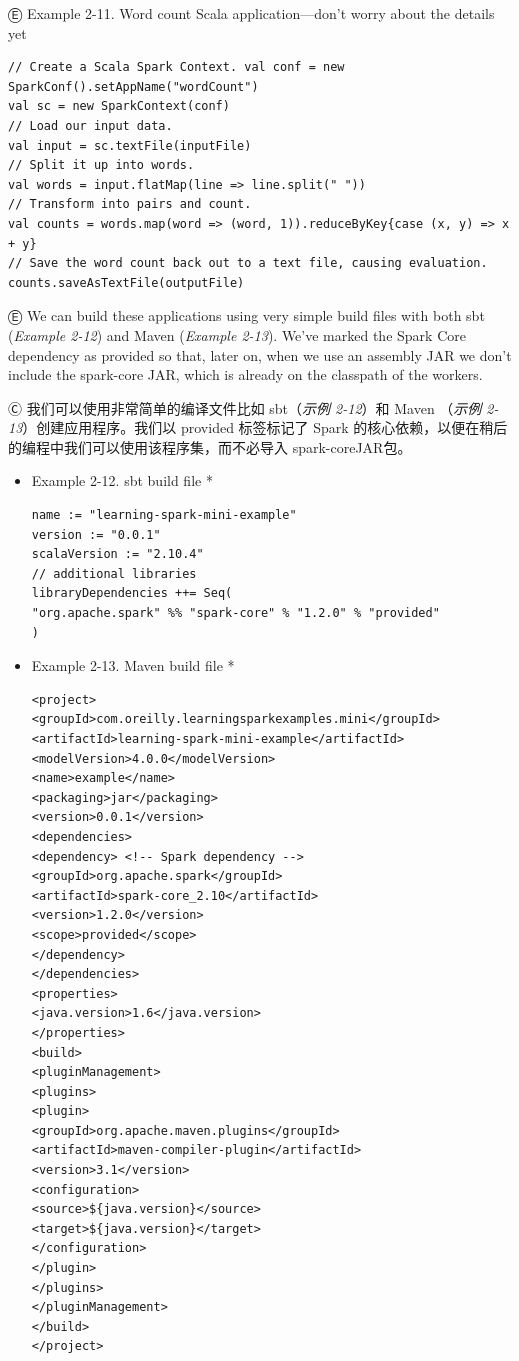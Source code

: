 {{Ⓔ Example 2-11. Word count Scala application---don't worry about the
details yet

\begin{lstlisting}
// Create a Scala Spark Context. val conf = new
SparkConf().setAppName("wordCount")
val sc = new SparkContext(conf)
// Load our input data.
val input = sc.textFile(inputFile)
// Split it up into words.
val words = input.flatMap(line => line.split(" "))
// Transform into pairs and count.
val counts = words.map(word => (word, 1)).reduceByKey{case (x, y) => x + y}
// Save the word count back out to a text file, causing evaluation.
counts.saveAsTextFile(outputFile)
\end{lstlisting}

Ⓔ \textcolor{etc}{We can build these applications using very simple build files with both sbt (\emph{Example 2-12}) and Maven (\emph{Example 2-13}). We've marked the Spark Core dependency as provided so that, later on, when we use an assembly JAR we don't include the spark-core JAR, which is already on the classpath of the workers.}

Ⓒ 我们可以使用非常简单的编译文件比如 sbt（\emph{示例 2-12}）和 Maven
（\emph{示例 2-13}）创建应用程序。我们以 provided 标签标记了 Spark
的核心依赖，以便在稍后的编程中我们可以使用该程序集，而不必导入
spark-coreJAR包。

\begin{itemize}
\item
  Example 2-12. sbt build file *

\begin{lstlisting}
name := "learning-spark-mini-example"
version := "0.0.1"
scalaVersion := "2.10.4"
// additional libraries
libraryDependencies ++= Seq(
"org.apache.spark" %% "spark-core" % "1.2.0" % "provided"
)
\end{lstlisting}
\item
  Example 2-13. Maven build file *

\begin{lstlisting}
<project>
<groupId>com.oreilly.learningsparkexamples.mini</groupId> <artifactId>learning-spark-mini-example</artifactId>
<modelVersion>4.0.0</modelVersion>
<name>example</name>
<packaging>jar</packaging>
<version>0.0.1</version>
<dependencies>
<dependency> <!-- Spark dependency -->
<groupId>org.apache.spark</groupId>
<artifactId>spark-core_2.10</artifactId>
<version>1.2.0</version>
<scope>provided</scope>
</dependency>
</dependencies>
<properties>
<java.version>1.6</java.version>
</properties>
<build>
<pluginManagement>
<plugins>
<plugin>
<groupId>org.apache.maven.plugins</groupId>
<artifactId>maven-compiler-plugin</artifactId>
<version>3.1</version>
<configuration>
<source>${java.version}</source>
<target>${java.version}</target>
</configuration>
</plugin>
</plugins>
</pluginManagement>
</build>
</project>
\end{lstlisting}
\end{itemize}

}}

